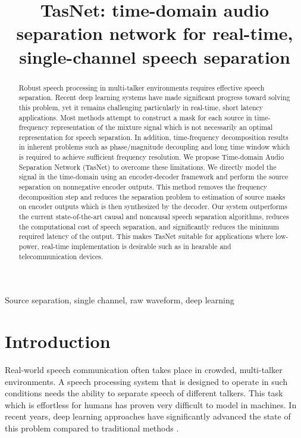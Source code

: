 \documentclass{article}
\title{TasNet: time-domain audio separation network for real-time, single-channel speech separation}
\begin{document}
\ninept
\maketitle
\begin{abstract}
 Robust speech processing in multi-talker environments requires effective speech separation. Recent deep learning systems have made significant progress toward solving this problem, yet it remains challenging particularly in real-time, short latency applications. Most methods attempt to construct a mask for each source in  time-frequency representation of the mixture signal which is not necessarily an optimal representation for speech separation. In addition, time-frequency decomposition results in inherent problems such as phase/magnitude decoupling and long time window which is required to achieve sufficient frequency resolution. We propose Time-domain Audio Separation Network (TasNet) to overcome these limitations. We directly model the signal in the time-domain using an encoder-decoder framework and perform the source separation on nonnegative encoder outputs. This method removes the frequency decomposition step and reduces the separation problem to estimation of source masks on encoder outputs which is then synthesized by the decoder. Our system outperforms the current state-of-the-art causal and noncausal speech separation algorithms, reduces the computational cost of speech separation, and significantly reduces the minimum required latency of the output. This makes TasNet suitable for applications where  low-power, real-time implementation is desirable such as in hearable and telecommunication devices.  \end{abstract}
\begin{keywords}
Source separation, single channel, raw waveform, deep learning
\end{keywords}
\section{Introduction}
\label{sec:intro}

Real-world speech communication often takes place in crowded, multi-talker environments. A speech processing system that is designed to operate in such conditions needs the ability to separate speech of different talkers. This task which is effortless for humans has proven very difficult to model in machines. In recent years, deep learning approaches have significantly advanced the state of this problem compared to traditional methods \cite{huang2015joint, zhang2016deep, isik2016single, kolbaek2017multitalker, chen2017deep, luo2017speaker}.  
\end{document}
